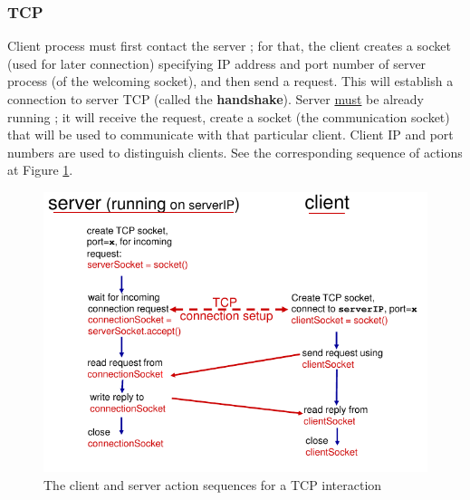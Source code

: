 \documentclass[12pt,a4paper]{article}
\begin{document}
\subsubsection{TCP}
Client process must first contact the server ; for that, the client creates a socket (used for later connection) specifying IP address and port number of server process (of the welcoming socket), and then send a request. This will establish a connection to server TCP (called the \textbf{handshake}). Server \uline{must} be already running ; it will receive the request, create a socket (the communication socket) that will be used to communicate with that particular client. Client IP and port numbers are used to distinguish clients. See the corresponding sequence of actions at Figure \ref{fig: tcp_sequence}.
\begin{figure}[!h]
	\centering
	\includegraphics[scale=0.5]{images/tcp_sequence}
	\caption{The client and server action sequences for a TCP interaction}
	\label{fig: tcp_sequence}
\end{figure}
\end{document}
